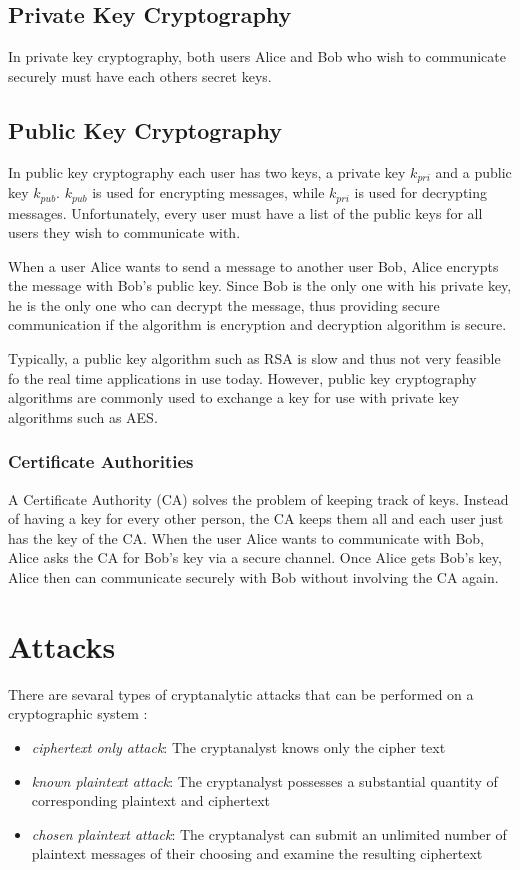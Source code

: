 \documentclass[12pt]{article}
\begin{document}
\subsection{Private Key Cryptography}
In private key cryptography, both users Alice and Bob who wish to communicate securely must have each others secret keys.
\subsection{Public Key Cryptography}
In public key cryptography each user has two keys, a private key $k_{pri}$ and a public key $k_{pub}$. $k_{pub}$ is used for encrypting messages, while $k_{pri}$ is used for decrypting messages. Unfortunately, every user must have a list of the public keys for all users they wish to communicate with.

When a user Alice wants to send a message to another user Bob, Alice encrypts the message with Bob's public key. Since Bob is the only one with his private key, he is the only one who can decrypt the message, thus providing secure communication if the algorithm is encryption and decryption algorithm is secure.

Typically, a public key algorithm such as RSA is slow and thus not very feasible fo the real time applications in use today. However, public key cryptography algorithms are commonly used to exchange a key for use with private key algorithms such as AES.

\subsubsection{Certificate Authorities}
A Certificate Authority (CA) solves the problem of keeping track of keys. Instead of having a key for every other person, the CA keeps them all and each user just has the key of the CA. When the user Alice wants to communicate with Bob, Alice asks the CA for Bob's key via a secure channel. Once Alice gets Bob's key, Alice then can communicate securely with Bob without involving the CA again.

\section{Attacks}

There are sevaral types of cryptanalytic attacks that can be performed on a cryptographic system \cite{diffiehellman}:
\begin{itemize}
	\item{\textit{ciphertext only attack}: The cryptanalyst knows only the cipher text}
	\item{\textit{known plaintext attack}: The cryptanalyst possesses a substantial quantity of corresponding plaintext and ciphertext}
	\item{\textit{chosen plaintext attack}: The cryptanalyst can submit an unlimited number of plaintext messages of their choosing and examine the resulting ciphertext}
\end{itemize}
\end{document}
